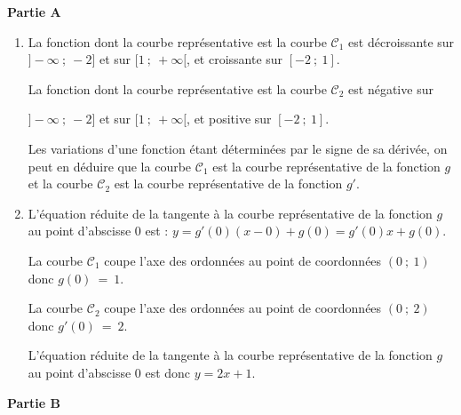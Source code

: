 
%
%
\medskip

\textbf{Partie A}

\medskip


\begin{enumerate}
\item  La fonction dont la courbe représentative est la courbe $\mathcal{C}_{1}$ est décroissante sur $]-\infty~;~-2]$ et sur $[1~;~+\infty[$, et croissante sur $[-2~;~1]$.

La fonction dont la courbe représentative est la courbe $\mathcal{C}_{2}$ est négative sur

{$]-\infty~;~-2]$} et sur $[1~;~+\infty[$, et positive sur $[-2~;~1]$.

Les variations d'une fonction étant déterminées par le signe de sa dérivée, on peut en déduire que la courbe $\mathcal{C}_{1}$ est la courbe représentative de la fonction $g$ et la courbe $\mathcal{C}_{2}$ est la courbe représentative de la fonction $g'$. 


\item L'équation réduite de la tangente à la 
courbe représentative de la fonction $g$ au point d'abscisse 0 est : $y = g'(0)(x - 0)+ g(0)=g'(0)x+g(0)$.

La courbe $\mathcal{C}_{1}$ coupe l'axe des ordonnées au point de coordonnées $(0~;~1)$ donc $g(0)~=~1$.

La courbe $\mathcal{C}_{2}$ coupe l'axe des ordonnées au point de coordonnées $(0~;~2)$ donc $g'(0)~=~2$.

L'équation réduite de la tangente à la courbe représentative de la fonction $g$ au point d'abscisse 0 est donc $y = 2x+1$.
\end{enumerate}

\medskip

\textbf{Partie B}

\medskip


